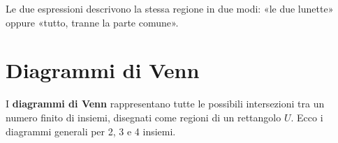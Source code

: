 \begin{spiegazione}
    Le due espressioni descrivono la stessa regione in due modi: «le due lunette» oppure «tutto, tranne la parte comune».
    \begin{center}
    \end{center}
\end{spiegazione}


\section{Diagrammi di Venn}\label{sec:venn}

I \textbf{diagrammi di Venn} rappresentano tutte le possibili intersezioni tra un numero finito di insiemi,
disegnati come regioni di un rettangolo $U$. Ecco i diagrammi generali per 2, 3 e 4 insiemi.

